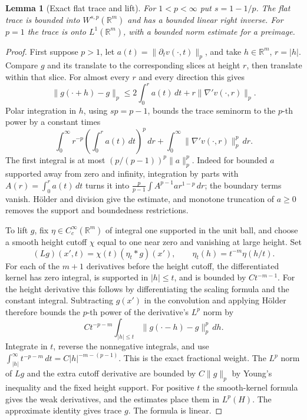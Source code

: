 \documentclass[11pt,oneside,openany]{book}
\newtheorem{lemma}[theorem]{Lemma}
\theoremstyle{definition}
\theoremstyle{remark}
\begin{document}
\begin{lemma}[Exact flat trace and lift]\label{p102:u5-flat-trace}
For \(1<p<\infty\) put \(s=1-1/p\). The flat trace is bounded into
\(W^{s,p}(\mathbb R^m)\) and has a bounded linear right inverse.
For \(p=1\) the trace is onto \(L^1(\mathbb R^m)\), with a bounded
norm estimate for a preimage.
\end{lemma}
\begin{proof}
First suppose \(p>1\), let \(a(t)=\|\partial_t v(\cdot,t)\|_p\), and
take \(h\in\mathbb R^m\), \(r=|h|\). Compare \(g\) and its translate
to the corresponding slices at height \(r\), then translate within
that slice. For almost every \(r\) and every direction this gives
\[
 \|g(\cdot+h)-g\|_p
 \le 2\int_0^r a(t)\,dt+r\|\nabla' v(\cdot,r)\|_p .
\]
Polar integration in \(h\), using \(sp=p-1\), bounds the trace
seminorm to the \(p\)-th power by a constant times
\[
 \int_0^\infty r^{-p}\left(\int_0^r a(t)\,dt\right)^p\,dr
 +\int_0^\infty\|\nabla'v(\cdot,r)\|_p^p\,dr.
\]
The first integral is at most \((p/(p-1))^p\|a\|_p^p\).
Indeed for bounded \(a\) supported away from zero and infinity,
integration by parts with \(A(r)=\int_0^r a(t)\,dt\)
turns it into \(\frac{p}{p-1}\int A^{p-1}a r^{1-p}\,dr\);
the boundary terms vanish. H\"older and division give the
estimate, and monotone truncation of \(a\ge0\) removes the
support and boundedness restrictions.

To lift \(g\), fix \(\eta\in C_c^\infty(\mathbb R^m)\) of integral one
supported in the unit ball, and choose a smooth height cutoff \(\chi\)
equal to one near zero and vanishing at large height. Set
\[
 (L g)(x',t)=\chi(t)(\eta_t*g)(x'),\qquad
 \eta_t(h)=t^{-m}\eta(h/t).
\]
For each of the \(m+1\) derivatives before the height cutoff, the
differentiated kernel has zero integral, is supported in \(|h|\le t\),
and is bounded by \(Ct^{-m-1}\). For the height derivative this follows
by differentiating the scaling formula and the constant integral.
Subtracting \(g(x')\) in the convolution and applying H\"older
therefore bounds the \(p\)-th power of the derivative's \(L^p\) norm
by
\[
 C t^{-p-m}\int_{|h|\le t}\|g(\cdot-h)-g\|_p^p\,dh.
\]
Integrate in \(t\), reverse the nonnegative integrals, and use
\(\int_{|h|}^\infty t^{-p-m}\,dt
=C|h|^{-m-(p-1)}\). This is the exact fractional weight.
The \(L^p\) norm of \(Lg\) and the extra cutoff derivative are
bounded by \(C\|g\|_p\) by Young's inequality and the fixed
height support. For positive \(t\) the smooth-kernel formula
gives the weak derivatives, and the estimates place them in
\(L^p(H)\). The approximate identity gives trace \(g\). The
formula is linear.


\end{proof}
\end{document}
